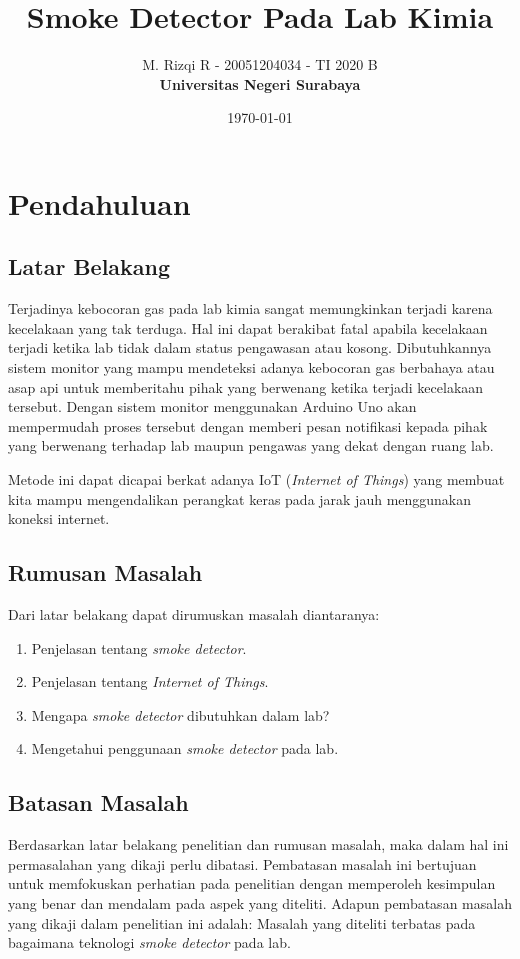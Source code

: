 \documentclass{article}
\title{\textbf{Smoke Detector Pada Lab Kimia}}
\author{M. Rizqi R -  
        20051204034 -
        TI 2020 B \\
        \textbf{Universitas Negeri Surabaya}
}
\date{\today}
\begin{document}
    \maketitle

    \section{Pendahuluan}
    \subsection{Latar Belakang}
    Terjadinya kebocoran gas pada lab kimia sangat memungkinkan terjadi karena
    kecelakaan yang tak terduga. Hal ini dapat berakibat fatal apabila kecelakaan
    terjadi ketika lab tidak dalam status pengawasan atau kosong. Dibutuhkannya 
    sistem monitor yang mampu mendeteksi adanya kebocoran gas berbahaya atau asap 
    api untuk memberitahu pihak yang berwenang ketika terjadi kecelakaan tersebut.
    Dengan sistem monitor menggunakan Arduino Uno akan mempermudah proses tersebut
    dengan memberi pesan notifikasi kepada pihak yang berwenang terhadap lab
    maupun pengawas yang dekat dengan ruang lab.

    Metode ini dapat dicapai berkat adanya IoT (\textit{Internet of Things}) 
    yang membuat kita mampu mengendalikan perangkat keras pada jarak jauh
    menggunakan koneksi internet.
    \subsection{Rumusan Masalah}
    Dari latar belakang dapat dirumuskan masalah diantaranya:
    \begin{enumerate}
        \item Penjelasan tentang \textit{smoke detector}.
        \item Penjelasan tentang \textit{Internet of Things}.
        \item Mengapa \textit{smoke detector} dibutuhkan dalam lab?
        \item Mengetahui penggunaan \textit{smoke detector} pada lab.
    \end{enumerate} 
    \subsection{Batasan Masalah}
    Berdasarkan latar belakang penelitian dan rumusan masalah, maka dalam hal ini
    permasalahan yang dikaji perlu dibatasi. Pembatasan masalah ini bertujuan untuk
    memfokuskan perhatian pada penelitian dengan memperoleh kesimpulan yang benar
    dan mendalam pada aspek yang diteliti. Adapun pembatasan masalah yang dikaji
    dalam penelitian ini adalah: Masalah yang diteliti terbatas pada bagaimana 
    teknologi \textit{smoke detector} pada lab.
\end{document}
